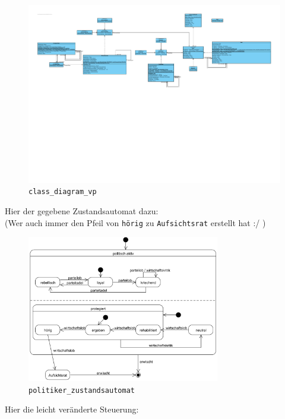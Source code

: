 \documentclass{article}
\begin{document}
\begin{enumerate}[label=\alph*.]
            \begin{figure}[ht]
                \includegraphics[trim=0cm 10cm 0cm 0cm, width=\textwidth]{swt_wende_tim_h10_class_diagram_vp.pdf}
                \caption{\texttt{class\_diagram\_vp}}
            \end{figure}

            Hier der gegebene Zustandsautomat dazu:\\
            (Wer auch immer den Pfeil von \texttt{hörig} zu \texttt{Aufsichtsrat} erstellt hat :/ )

            \begin{figure}[ht]
                \centering
                \includegraphics[width=0.75\textwidth]{politiker_zustandsautomat.png}
                \caption{\texttt{politiker\_zustandsautomat}}
            \end{figure}

            \newpage
            Hier die leicht veränderte Steuerung:


\end{enumerate}
\end{document}

